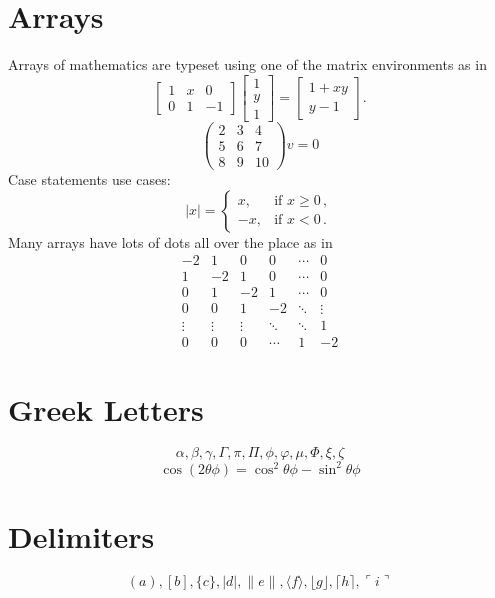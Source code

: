 \section{Arrays}
Arrays of mathematics are typeset using one of the matrix environments as
in
\[
    \begin{bmatrix}
        1 & x & 0  \\
        0 & 1 & -1
    \end{bmatrix}\begin{bmatrix}
        1 \\
        y \\
        1
    \end{bmatrix}
    =\begin{bmatrix}
        1+xy \\
        y-1
    \end{bmatrix}.
\]
\[ \begin{pmatrix}
        2 & 3 & 4  \\
        5 & 6 & 7  \\
        8 & 9 & 10\end{pmatrix} v = 0 \]
Case statements use cases:
\[
    |x|=\begin{cases}
        x,  & \text{if }x\geq 0\,, \\
        -x, & \text{if }x< 0\,.
    \end{cases}
\]
Many arrays have lots of dots all over the place as in
\[
    \begin{matrix}
        -2     & 1      & 0      & 0      & \cdots & 0      \\
        1      & -2     & 1      & 0      & \cdots & 0      \\
        0      & 1      & -2     & 1      & \cdots & 0      \\
        0      & 0      & 1      & -2     & \ddots & \vdots \\
        \vdots & \vdots & \vdots & \ddots & \ddots & 1      \\
        0      & 0      & 0      & \cdots & 1      & -2
    \end{matrix}
\]

\section{Greek Letters}
\[ \alpha,  \beta,  \gamma, \Gamma, \pi, \Pi, \phi, \varphi, \mu, \Phi, \xi, \zeta \]
\[ \cos(2\theta\phi) = \cos^2 \theta\phi - \sin^2 \theta\phi \]

\section{Delimiters}
\[ ( a ), [ b ], \{ c \}, | d |, \| e \|,
    \langle f \rangle, \lfloor g \rfloor,
    \lceil h \rceil, \ulcorner i \urcorner
\]

